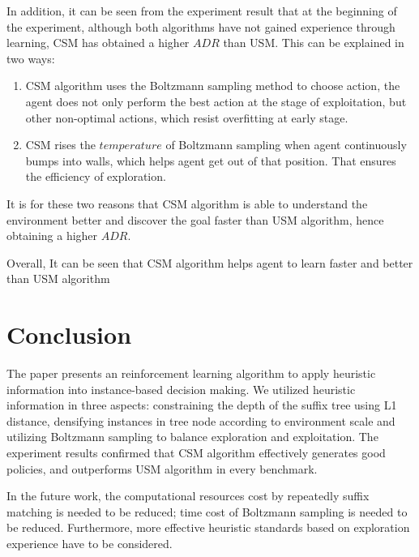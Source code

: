 \documentclass{article}
\begin{document}
In addition, it can be seen from the experiment result that at the beginning of the experiment,
although both algorithms have not gained experience through learning, CSM has obtained a higher
$ADR$ than USM. This can be explained in two ways:
\begin{enumerate}
  \item CSM algorithm uses the Boltzmann sampling method to choose action, the agent does
  not only perform the best action at the stage of exploitation, but  other non-optimal actions,
  which resist overfitting at early stage.
  
  \item CSM rises the $temperature$ of Boltzmann sampling when agent continuously bumps into walls,
  which helps agent get out of that position. That ensures the efficiency of exploration.
  
\end{enumerate}
It is for these two reasons that CSM algorithm is able to understand the environment better and
discover the goal faster than USM algorithm, hence obtaining a higher $ADR$.

Overall, It can be seen that CSM algorithm helps agent to learn faster and better than USM algorithm


\section{Conclusion}

The paper presents an reinforcement learning algorithm to apply heuristic information
into instance-based decision making. We utilized heuristic information in three aspects: constraining the depth
of the suffix tree using L1 distance, densifying instances in tree node according to environment scale 
and utilizing Boltzmann sampling to balance exploration and exploitation. The experiment results
confirmed that CSM algorithm effectively generates good policies, and outperforms USM algorithm in
every benchmark.

In the future work, the computational resources cost by repeatedly suffix matching
is needed to be reduced; time cost of Boltzmann sampling is needed to be reduced.
Furthermore, more effective heuristic standards based on exploration experience have
to be considered. 




\clearpage
\small


\end{document}
